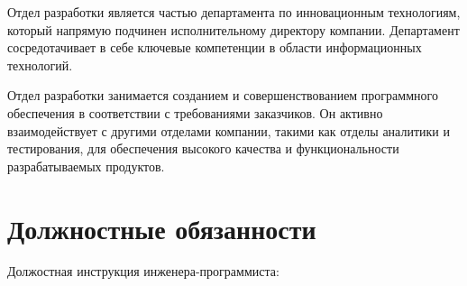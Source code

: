 \documentclass[12pt,a4paper,draft]{belgost/belgost}
\begin{document}
Отдел разработки является частью департамента по инновационным технологиям, который напрямую подчинен исполнительному директору компании.
Департамент сосредотачивает в себе ключевые компетенции в области информационных технологий.

Отдел разработки занимается созданием и совершенствованием программного обеспечения в соответствии с требованиями заказчиков.
Он активно взаимодействует с другими отделами компании, такими как отделы аналитики и тестирования, для обеспечения высокого качества и функциональности разрабатываемых продуктов.

\chapter{Должностные обязанности}

Должостная инструкция инженера-программиста:
\end{document}
